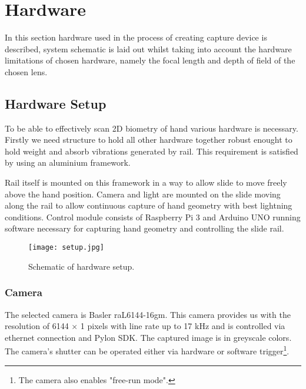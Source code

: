 \section{Hardware}
\label{sec:hw}

In this section hardware used in the process of creating capture device is described, system schematic is laid out whilst taking into account the hardware limitations of chosen hardware, namely the focal length and depth of field of the chosen lens.

\subsection{Hardware Setup}
To be able to effectively scan 2D biometry of hand various hardware is necessary. Firstly we need structure to hold all other hardware together robust enought to hold weight and absorb vibrations generated by rail. This requirement is satisfied by using an aluminium framework.

Rail itself is mounted on this framework in a way to allow slide to move freely above the hand position. Camera and light are mounted on the slide moving along the rail to allow continuous capture of hand geometry with best lightning conditions.
Control module consists of Raspberry Pi 3 and Arduino UNO running software necessary for capturing hand geometry and controlling the slide rail.
\begin{figure}[ht!]
    \label{fig:setup}
    \centering
    \texttt{[image: setup.jpg]}
    \caption{Schematic of hardware setup.}
\end{figure}


\subsubsection*{Camera}
The selected camera is Basler raL6144-16gm. This camera provides us with the resolution of 6144 $\times$ 1 pixels with line rate up to 17 kHz and is controlled via ethernet connection and Pylon SDK.
The captured image is in greyscale colors. The camera's shutter can be operated either via hardware or software trigger\footnote{The camera also enables "free-run mode".}.

